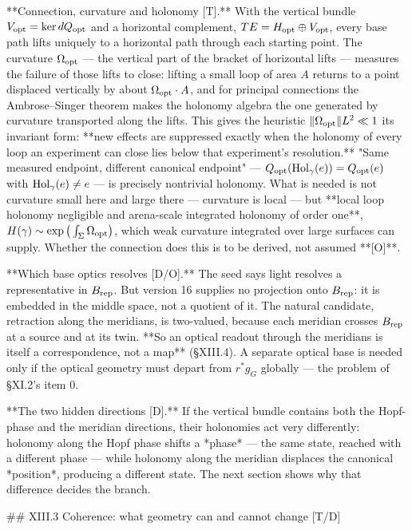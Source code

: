 **Connection, curvature and holonomy [T].** With the vertical bundle $V_{\rm opt} = \ker dQ_{\rm opt}$ and a horizontal complement, $TE = H_{\rm opt}\oplus V_{\rm opt}$, every base path lifts uniquely to a horizontal path through each starting point. The curvature $\Omega_{\rm opt}$ — the vertical part of the bracket of horizontal lifts — measures the failure of those lifts to close: lifting a small loop of area $A$ returns to a point displaced vertically by about $\Omega_{\rm opt}\cdot A$, and for principal connections the Ambrose–Singer theorem makes the holonomy algebra the one generated by curvature transported along the lifts. This gives the heuristic $\|\Omega_{\rm opt}\|L^2\ll1$ its invariant form: **new effects are suppressed exactly when the holonomy of every loop an experiment can close lies below that experiment's resolution.** "Same measured endpoint, different canonical endpoint" — $Q_{\rm opt}({\rm Hol}_\gamma(e)) = Q_{\rm opt}(e)$ with ${\rm Hol}_\gamma(e)\neq e$ — is precisely nontrivial holonomy. What is needed is not curvature small here and large there — curvature is local — but **local loop holonomy negligible and arena-scale integrated holonomy of order one**, $H(\gamma)\sim\exp\big(\int_\Sigma\Omega_{\rm opt}\big)$, which weak curvature integrated over large surfaces can supply. Whether the connection does this is to be derived, not assumed **[O]**.

**Which base optics resolves [D/O].** The seed says light resolves a representative in $B_{\rm rep}$. But version 16 supplies no projection onto $B_{\rm rep}$: it is embedded in the middle space, not a quotient of it. The natural candidate, retraction along the meridians, is two-valued, because each meridian crosses $B_{\rm rep}$ at a source and at its twin. **So an optical readout through the meridians is itself a correspondence, not a map** (§XIII.4). A separate optical base is needed only if the optical geometry must depart from $r^*g_G$ globally — the problem of §XI.2's item 0.

**The two hidden directions [D].** If the vertical bundle contains both the Hopf-phase and the meridian directions, their holonomies act very differently: holonomy along the Hopf phase shifts a *phase* — the same state, reached with a different phase — while holonomy along the meridian displaces the canonical *position*, producing a different state. The next section shows why that difference decides the branch.

## XIII.3 Coherence: what geometry can and cannot change [T/D]


